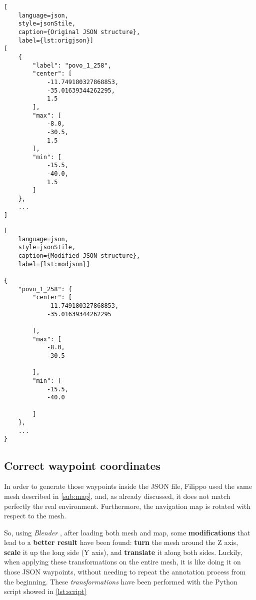 \noindent\begin{minipage}{0.425\textwidth}
\noindent\begin{lstlisting}[
    language=json,
    style=jsonStile,
    caption={Original JSON structure},
    label={lst:origjson}]
[
    {
        "label": "povo_1_258",
        "center": [
            -11.749180327868853,
            -35.01639344262295,
            1.5
        ],
        "max": [
            -8.0,
            -30.5,
            1.5
        ],
        "min": [
            -15.5,
            -40.0,
            1.5
        ]
    },
    ...
]
\end{lstlisting}
\end{minipage}
\noindent\begin{minipage}{0.15\textwidth}
    \centering
    \noindent{}
\end{minipage}
\noindent\begin{minipage}{0.425\textwidth}
\noindent\begin{lstlisting}[
    language=json,
    style=jsonStile,
    caption={Modified JSON structure},
    label={lst:modjson}]

{
    "povo_1_258": {
        "center": [
            -11.749180327868853,
            -35.01639344262295

        ],
        "max": [
            -8.0,
            -30.5

        ],
        "min": [
            -15.5,
            -40.0

        ]
    },
    ...
}
\end{lstlisting}
\end{minipage}


\subsection{Correct waypoint coordinates}
\label{sub:waypoints}

In order to generate those waypoints inside the JSON file, Filippo used the same mesh described in \autoref{sub:map}, and, as already discussed, it does not match perfectly the real environment. Furthermore, the navigation map is rotated with respect to the mesh.

So, using \textit{Blender} \cite{blender}, after loading both mesh and map, some \textbf{modifications} that lead to a \textbf{better result} have been found: \textbf{turn} the mesh around the Z axis, \textbf{scale} it up the long side (Y axis), and \textbf{translate} it along both sides. Luckily, when applying these transformations on the entire mesh, it is like doing it on those JSON waypoints, without needing to repeat the annotation process from the beginning. These \textit{transformations} have been performed with the Python script showed in \autoref{lst:script}


